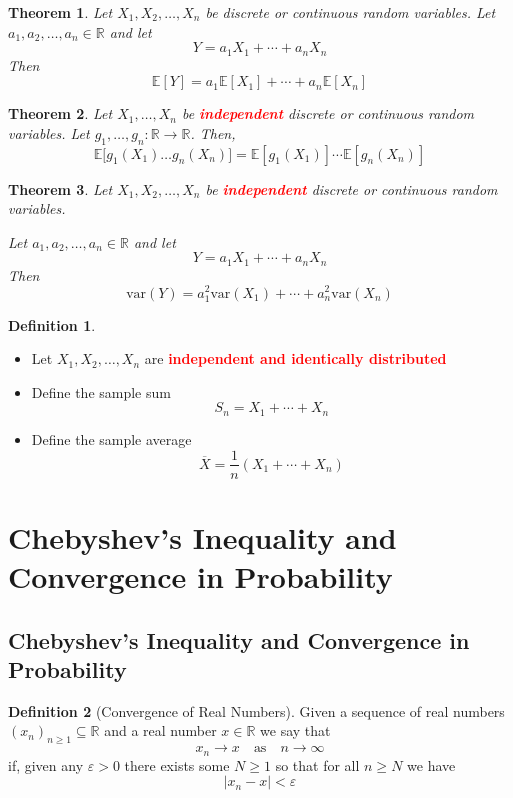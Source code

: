 \documentclass{article}
\newcommand{\R}{\mathbb{R}}
\newcommand{\E}{\mathbb{E}}
\newcommand{\var}{\text{var}}
\newcommand{\bfred}[1]{\textcolor{red}{\textbf{#1}}}
\theoremstyle{plain}
\newtheorem{thm}{Theorem}[section]
\theoremstyle{definition}
\newtheorem{defn}{Definition}[section]
\theoremstyle{remark}
\begin{document}
\begin{thm}
    Let $X_1,X_2,\dotsc,X_n$ be discrete or continuous random variables. Let $a_1,a_2,\dotsc,a_n\in\R$ and let \[Y=a_1X_1+\dotsb+a_nX_n\] Then \[\E[Y]=a_1\E[X_1]+\dotsb+a_n\E[X_n]\]
\end{thm}

\begin{thm}
    Let $X_1, \dotsc,X_n$ be \bfred{independent} discrete or continuous random variables. Let $g_1,\dotsc,g_n:\R\rightarrow\R$. Then, \[\E\bigr[g_1(X_1)\dotsc g_n(X_n)\bigr]=\E[g_1(X_1)]\dotsm\E[g_n(X_n)]\]
\end{thm}

\begin{thm}
    Let $X_1,X_2,\dotsc,X_n$ be \bfred{independent} discrete or continuous random variables.

    \noindent Let $a_1, a_2,\dotsc, a_n\in\R$ and let \[Y=a_1X_1+\dotsb+a_nX_n\] Then \[\var(Y)=a_1^2\var(X_1)+\dotsb+a_n^2\var(X_n)\]
\end{thm}

\begin{defn}
    \begin{itemize}
        \item Let $X_1,X_2,\dotsc,X_n$ are \bfred{independent and identically distributed}
        \item Define the sample sum \[S_n=X_1+\dotsb+X_n\]
        \item Define the sample average \[\overline{X} = \frac{1}{n}(X_1+\dotsb+X_n)\]
    \end{itemize}
\end{defn}

\section{Chebyshev's Inequality and Convergence in Probability}

\subsection{Chebyshev's Inequality and Convergence in Probability}

\begin{defn}[Convergence of Real Numbers]
    Given a sequence of real numbers $(x_n)_{n\geq1}\subseteq\R$ and a real number $x\in\R$ we say that \[x_n\rightarrow x\quad\text{as}\quad n\rightarrow\infty\] if, given any $\varepsilon>0$ there exists some $N\geq1$ so that for all $n\geq N$ we have \[|x_n-x|<\varepsilon\]
\end{defn}
\end{document}
